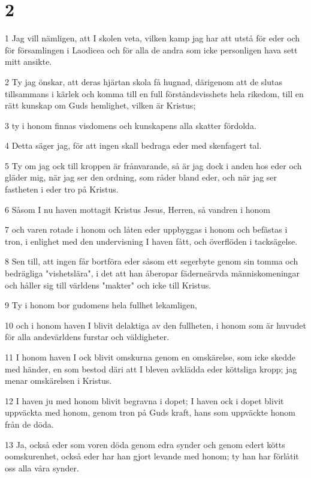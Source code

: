 \chapter{2}

\par 1 Jag vill nämligen, att I skolen veta, vilken kamp jag har att utstå för eder och för församlingen i Laodicea och för alla de andra som icke personligen hava sett mitt ansikte.
\par 2 Ty jag önskar, att deras hjärtan skola få hugnad, därigenom att de slutas tillsammans i kärlek och komma till en full förståndsvisshets hela rikedom, till en rätt kunskap om Guds hemlighet, vilken är Kristus;
\par 3 ty i honom finnas visdomens och kunskapens alla skatter fördolda.
\par 4 Detta säger jag, för att ingen skall bedraga eder med skenfagert tal.
\par 5 Ty om jag ock till kroppen är frånvarande, så är jag dock i anden hos eder och gläder mig, när jag ser den ordning, som råder bland eder, och när jag ser fastheten i eder tro på Kristus.
\par 6 Såsom I nu haven mottagit Kristus Jesus, Herren, så vandren i honom
\par 7 och varen rotade i honom och låten eder uppbyggas i honom och befästas i tron, i enlighet med den undervisning I haven fått, och överflöden i tacksägelse.
\par 8 Sen till, att ingen får bortföra eder såsom ett segerbyte genom sin tomma och bedrägliga "vishetslära", i det att han åberopar fäderneärvda människomeningar och håller sig till världens "makter" och icke till Kristus.
\par 9 Ty i honom bor gudomens hela fullhet lekamligen,
\par 10 och i honom haven I blivit delaktiga av den fullheten, i honom som är huvudet för alla andevärldens furstar och väldigheter.
\par 11 I honom haven I ock blivit omskurna genom en omskärelse, som icke skedde med händer, en som bestod däri att I bleven avklädda eder köttsliga kropp; jag menar omskärelsen i Kristus.
\par 12 I haven ju med honom blivit begravna i dopet; I haven ock i dopet blivit uppväckta med honom, genom tron på Guds kraft, hans som uppväckte honom från de döda.
\par 13 Ja, också eder som voren döda genom edra synder och genom edert kötts oomskurenhet, också eder har han gjort levande med honom; ty han har förlåtit oss alla våra synder.
